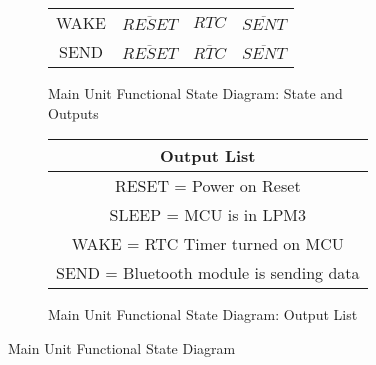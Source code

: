 \begin{landscape}
\begin{figure}[!ht]
\begin{center}
\begin{subfigure}[b]{0.5\textwidth}
\begin{tabular}{c|ccc}
        WAKE&$\overline{RESET}$&$RTC$&$\overline{SENT}$\\
        SEND&$\overline{RESET}$&$\overline{RTC}$&$\overline{SENT}$\\
      \end{tabular}
      \caption{Main Unit Functional State Diagram: State and Outputs}
      \label{fig:main-unit-modular-fsd-state-outputs}
  \end{subfigure}
  \begin{subfigure}[b]{0.5\textwidth}
   \begin{tabular}{|c|}
    \hline
     Output List\\
    \hline
     RESET = Power on Reset\\
     SLEEP = MCU is in LPM3\\
     WAKE = RTC Timer turned on MCU\\
     SEND = Bluetooth module is sending data\\
    \hline
   \end{tabular}
      \caption{Main Unit Functional State Diagram: Output List}
      \label{fig:main-unit-modular-fsd-outputs-list}
  \end{subfigure}
\end{center}
\caption{Main Unit Functional State Diagram}
\label{fig:main-unit-modular-fsd}
\end{figure}
\end{landscape}
